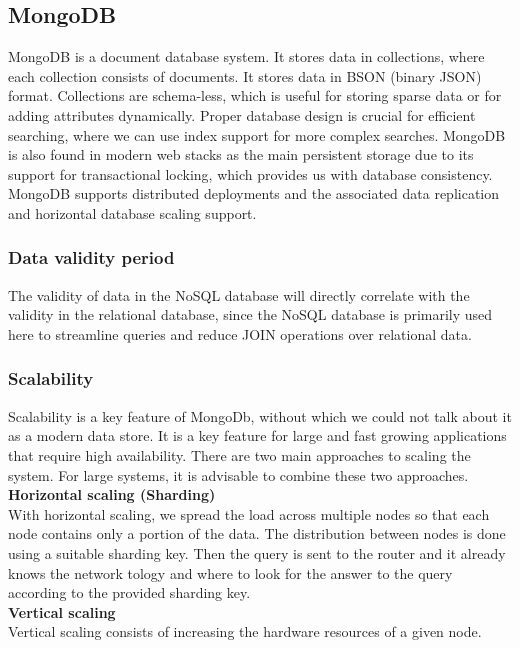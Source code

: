 \documentclass[12pt,english]{article}
\begin{document}
\newpage

\subsection{MongoDB}
MongoDB is a document database system. It stores data in collections, where each collection consists of documents. It stores data in BSON (binary JSON) format. Collections are schema-less, which is useful for storing sparse data or for adding attributes dynamically. Proper database design is crucial for efficient searching, where we can use index support for more complex searches. MongoDB is also found in modern web stacks as the main persistent storage due to its support for transactional locking, which provides us with database consistency. MongoDB supports distributed deployments and the associated data replication and horizontal database scaling support.


\subsubsection{Data validity period}
The validity of data in the NoSQL database will directly correlate with the validity in the relational database, since the NoSQL database is primarily used here to streamline queries and reduce JOIN operations over relational data.

\subsubsection{Scalability}
Scalability is a key feature of MongoDb, without which we could not talk about it as a modern data store. It is a key feature for large and fast growing applications that require high availability. There are two main approaches to scaling the system. For large systems, it is advisable to combine these two approaches.\\

\noindent\textbf{Horizontal scaling (Sharding)}\\
With horizontal scaling, we spread the load across multiple nodes so that each node contains only a portion of the data. The distribution between nodes is done using a suitable sharding key. Then the query is sent to the router and it already knows the network tology and where to look for the answer to the query according to the provided sharding key.\\

\noindent\textbf{Vertical scaling}\\
Vertical scaling consists of increasing the hardware resources of a given node.
\end{document}

